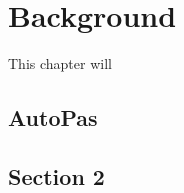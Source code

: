 \chapter[Background]{Background}
\label{cp:background}

{
\parindent0pt
This chapter will \textellipsis
}

\section{AutoPas}

\section{Section 2}
